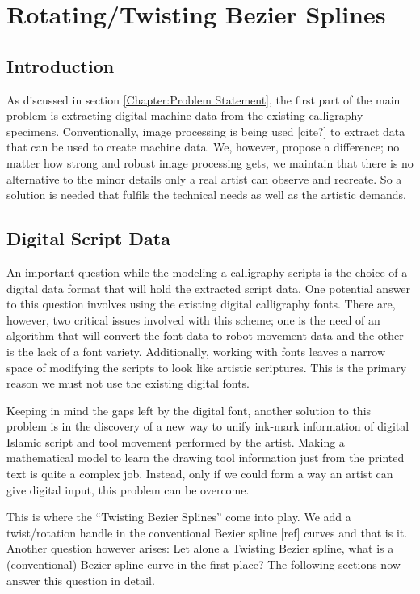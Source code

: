 \section{Rotating/Twisting Bezier Splines}
\label{Chapter:Twisting Splines}

    \subsection{Introduction}
    As discussed in section \ref{Chapter:Problem Statement}, the first part of the main problem is extracting digital machine data from the existing calligraphy specimens.  Conventionally, image processing is being used [cite?] to extract data that can be used to create machine data. We, however, propose a difference; no matter how strong and robust image processing gets, we maintain that there is no alternative to the minor details only a real artist can observe and recreate. So a solution is needed that fulfils the technical needs as well as the artistic demands.


    \subsection{Digital Script Data}

    An important question while the modeling a calligraphy scripts is the choice of a digital data format that will hold the extracted script data. One potential answer to this question involves using the existing digital calligraphy fonts. There are, however, two critical issues involved with this scheme; one is the need of an algorithm that will convert the font data to robot movement data and the other is the lack of a font variety. Additionally, working with fonts leaves a narrow space of modifying the scripts to look like artistic scriptures. This is the primary reason we must not use the existing digital fonts.

    Keeping in mind the gaps left by the digital font, another solution to this problem is in the discovery of a new way to unify ink-mark information of digital Islamic script and tool movement performed by the artist. Making a mathematical model to learn the drawing tool information just from the printed text is quite a complex job. Instead, only if we could form a way an artist can give digital input, this problem can be overcome.

    This is where the ``Twisting Bezier Splines'' come into play. We add a twist/rotation handle in the conventional Bezier spline [ref] curves and that is it. Another question however arises: Let alone a Twisting Bezier spline, what is a (conventional) Bezier spline curve in the first place? The following sections now answer this question in detail.

